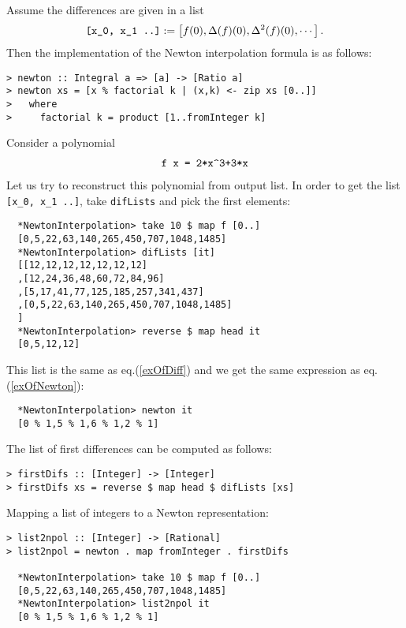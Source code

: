 \documentclass[11pt]{book}
\begin{document}
Assume the differences are given in a list
\begin{eqnarray}
\verb|[x_0, x_1 ..]| := \left[f(0), \Delta(f)(0), \Delta^2(f)(0), \cdots \right].
\end{eqnarray}
Then the implementation of the Newton interpolation formula is as follows:
\begin{verbatim}
> newton :: Integral a => [a] -> [Ratio a]
> newton xs = [x % factorial k | (x,k) <- zip xs [0..]]
>   where
>     factorial k = product [1..fromInteger k]
\end{verbatim}
Consider a polynomial
\begin{eqnarray}
\verb|f x = 2*x^3+3*x|
\end{eqnarray}
Let us try to reconstruct this polynomial from output list.
In order to get the list \verb+[x_0, x_1 ..]+, take \texttt{difLists} and pick the first elements:
\begin{verbatim}
  *NewtonInterpolation> take 10 $ map f [0..]
  [0,5,22,63,140,265,450,707,1048,1485]
  *NewtonInterpolation> difLists [it]
  [[12,12,12,12,12,12,12]
  ,[12,24,36,48,60,72,84,96]
  ,[5,17,41,77,125,185,257,341,437]
  ,[0,5,22,63,140,265,450,707,1048,1485]
  ]
  *NewtonInterpolation> reverse $ map head it
  [0,5,12,12]
\end{verbatim}
This list is the same as eq.(\ref{exOfDiff}) and we get the same expression as eq.(\ref{exOfNewton}):
\begin{verbatim}  
  *NewtonInterpolation> newton it
  [0 % 1,5 % 1,6 % 1,2 % 1]
\end{verbatim}

The list of first differences can be computed as follows:
\begin{verbatim}
> firstDifs :: [Integer] -> [Integer]
> firstDifs xs = reverse $ map head $ difLists [xs]
\end{verbatim}
Mapping a list of integers to a Newton representation:
\begin{verbatim}
> list2npol :: [Integer] -> [Rational]
> list2npol = newton . map fromInteger . firstDifs

  *NewtonInterpolation> take 10 $ map f [0..]
  [0,5,22,63,140,265,450,707,1048,1485]
  *NewtonInterpolation> list2npol it
  [0 % 1,5 % 1,6 % 1,2 % 1]
\end{verbatim}
\end{document}
